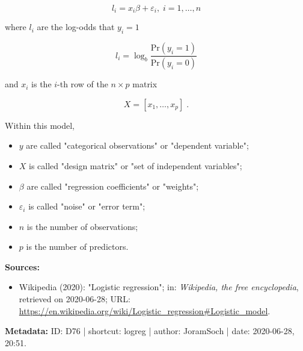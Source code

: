 \documentclass[a4paper,12pt,twoside]{book}
\begin{document}
\begin{equation} \label{eq:logreg-logreg}
l_i = x_i \beta + \varepsilon_i, \; i = 1,\ldots,n
\end{equation}

where $l_i$ are the log-odds that $y_i = 1$

\begin{equation} \label{eq:logreg-logodds}
l_i = \log_b \frac{\mathrm{Pr}(y_i = 1)}{\mathrm{Pr}(y_i = 0)}
\end{equation}

and $x_i$ is the $i$-th row of the $n \times p$ matrix

\begin{equation} \label{eq:logreg-X}
X = \left[ x_1, \ldots, x_p \right] \; .
\end{equation}

Within this model,

\begin{itemize}

\item $y$ are called "categorical observations" or "dependent variable";

\item $X$ is called "design matrix" or "set of independent variables";

\item $\beta$ are called "regression coefficients" or "weights";

\item $\varepsilon_i$ is called "noise" or "error term";

\item $n$ is the number of observations;

\item $p$ is the number of predictors.

\end{itemize}


\vspace{1em}
\textbf{Sources:}
\begin{itemize}
\item Wikipedia (2020): "Logistic regression"; in: \textit{Wikipedia, the free encyclopedia}, retrieved on 2020-06-28; URL: \url{https://en.wikipedia.org/wiki/Logistic_regression#Logistic_model}.
\end{itemize}


\vspace{1em}
\textbf{Metadata:} ID: D76 | shortcut: logreg | author: JoramSoch | date: 2020-06-28, 20:51.
\vspace{1em}
\end{document}
